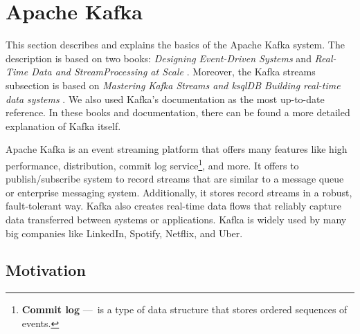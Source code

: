 \section{Apache Kafka}
\label{02:sec:title}

This section describes and explains the basics of the Apache Kafka system. The description is based on two books: \emph{Designing Event-Driven Systems} \cite{apacheKafkaDesignDistributedSystems} and \emph{Real-Time Data and StreamProcessing at Scale} \cite{apacheKafkaDefinitiveGuide}. Moreover, the Kafka streams subsection is based on \emph{Mastering Kafka Streams and ksqlDB Building real-time data systems} \cite{kafkaStreamsBook}. We also used Kafka's documentation \cite{kafkaDocumentation} as the most up-to-date reference. In these books and documentation, there can be found a more detailed explanation of Kafka itself.

Apache Kafka is an event streaming platform that offers many features like high performance, distribution, commit log service\footnote{\textbf{Commit log} 
---\ is a type of data structure that stores ordered sequences of events.}, and more. It offers to publish/subscribe system to record streams that are similar to a message queue or enterprise messaging system. Additionally, it stores record streams in a robust, fault-tolerant way. Kafka also creates real-time data flows that reliably capture data transferred between systems or applications. Kafka is widely used by many big companies like LinkedIn, Spotify, Netflix, and Uber.
\subsection{Motivation \cite{02-bachelor-thesis}}
\label{kafka:motivation}


